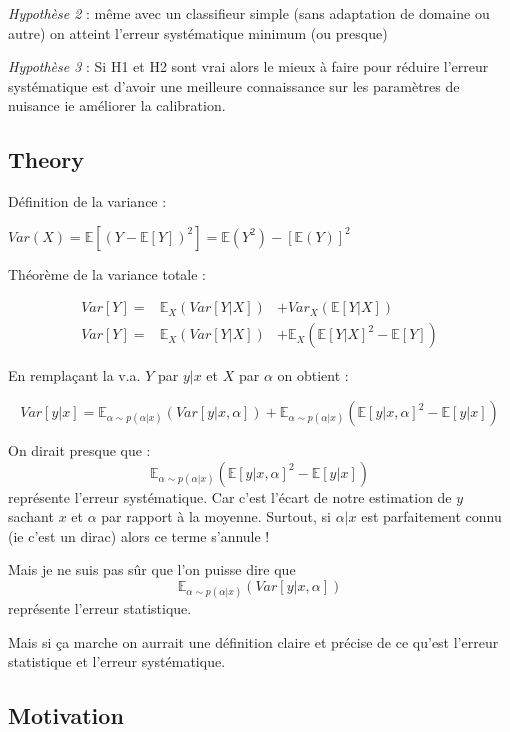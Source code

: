 \emph{Hypothèse 2} : même avec un classifieur simple (sans adaptation de domaine ou autre) on atteint l'erreur systématique minimum (ou presque)

\emph{Hypothèse 3} : Si H1 et H2 sont vrai alors le mieux à faire pour réduire l'erreur systématique est d'avoir une meilleure connaissance sur les paramètres de nuisance ie améliorer la calibration.

\subsection{Theory} %
\label{sub:theory}


Définition de la variance :

$Var(X) = \mathbb E[(Y - \mathbb E[Y])^2] = \mathbb E(Y^2) - [\mathbb E(Y)]^2$

Théorème de la variance totale :

\begin{eqnarray}
    Var[Y] =& \mathbb E_X \left (Var[Y|X] \right ) &+ Var_X \left (\mathbb E[Y|X]\right ) \\
    Var[Y] =& \mathbb E_X \left (Var[Y|X] \right ) &+ \mathbb E_X \left (\mathbb E [Y|X]^2  - \mathbb E[Y]\right )
\end{eqnarray}


En remplaçant la v.a. $Y$ par $y|x$ et $X$ par $\alpha$ on obtient :

$$
Var[y|x] = \mathbb E_{\alpha \sim p(\alpha|x)} \left (Var[y|x, \alpha] \right ) + \mathbb E_{\alpha \sim p(\alpha|x)} \left (\mathbb E [y|x, \alpha]^2  - \mathbb E[y|x]\right )
$$


On dirait presque que : 
$$\mathbb E_{\alpha \sim p(\alpha|x)} \left (\mathbb E [y|x, \alpha]^2  - \mathbb E[y|x]\right )$$
représente l'erreur systématique. 
Car c'est l'écart de notre estimation de $y$ sachant $x$ et $\alpha$ par rapport à la moyenne.
Surtout, si $\alpha|x$ est parfaitement connu (ie c'est un dirac) alors ce terme s'annule !

Mais je ne suis pas sûr que l'on puisse dire que
$$\mathbb E_{\alpha \sim p(\alpha|x)} \left (Var[y|x, \alpha] \right )$$
représente l'erreur statistique.

Mais si ça marche on aurrait une définition claire et précise de ce qu'est l'erreur statistique et l'erreur systématique.


\subsection{Motivation} %
\label{sub:motivation}

